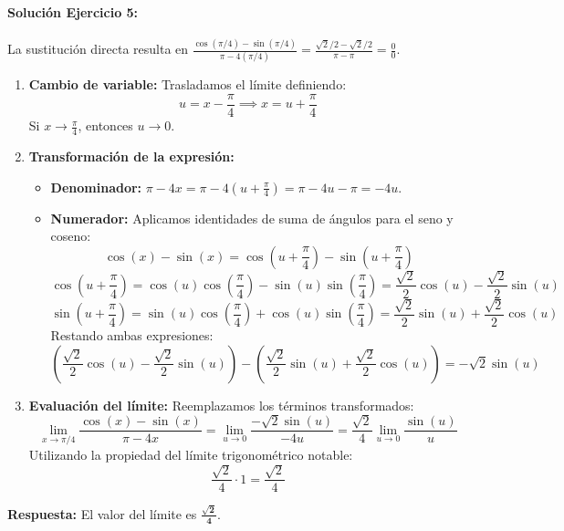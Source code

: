 \documentclass[11pt,letterpaper]{article}
\begin{document}
\paragraph{Solución Ejercicio 5:}
La sustitución directa resulta en $\frac{\cos(\pi/4) - \sin(\pi/4)}{\pi - 4(\pi/4)} = \frac{\sqrt{2}/2 - \sqrt{2}/2}{\pi - \pi} = \frac{0}{0}$.
\begin{enumerate}
    \item \textbf{Cambio de variable:} Trasladamos el límite definiendo:
    $$u = x - \frac{\pi}{4} \implies x = u + \frac{\pi}{4}$$
    Si $x \to \frac{\pi}{4}$, entonces $u \to 0$.
    \item \textbf{Transformación de la expresión:}
    \begin{itemize}
        \item \textbf{Denominador:} $\pi - 4x = \pi - 4\left(u + \frac{\pi}{4}\right) = \pi - 4u - \pi = -4u$.
        \item \textbf{Numerador:} Aplicamos identidades de suma de ángulos para el seno y coseno:
        $$\cos(x) - \sin(x) = \cos\left(u + \frac{\pi}{4}\right) - \sin\left(u + \frac{\pi}{4}\right)$$
        $$\cos\left(u + \frac{\pi}{4}\right) = \cos(u)\cos\left(\frac{\pi}{4}\right) - \sin(u)\sin\left(\frac{\pi}{4}\right) = \frac{\sqrt{2}}{2}\cos(u) - \frac{\sqrt{2}}{2}\sin(u)$$
        $$\sin\left(u + \frac{\pi}{4}\right) = \sin(u)\cos\left(\frac{\pi}{4}\right) + \cos(u)\sin\left(\frac{\pi}{4}\right) = \frac{\sqrt{2}}{2}\sin(u) + \frac{\sqrt{2}}{2}\cos(u)$$
        Restando ambas expresiones:
        $$\left( \frac{\sqrt{2}}{2}\cos(u) - \frac{\sqrt{2}}{2}\sin(u) \right) - \left( \frac{\sqrt{2}}{2}\sin(u) + \frac{\sqrt{2}}{2}\cos(u) \right) = -\sqrt{2}\sin(u)$$
    \end{itemize}
    \item \textbf{Evaluación del límite:} Reemplazamos los términos transformados:
    $$\lim_{x\to \pi/4} \frac{\cos(x) - \sin(x)}{\pi - 4x} = \lim_{u\to 0} \frac{-\sqrt{2}\sin(u)}{-4u} = \frac{\sqrt{2}}{4} \lim_{u\to 0} \frac{\sin(u)}{u}$$
    Utilizando la propiedad del límite trigonométrico notable:
    $$\frac{\sqrt{2}}{4} \cdot 1 = \frac{\sqrt{2}}{4}$$
\end{enumerate}
\textbf{Respuesta:} El valor del límite es $\mathbf{\frac{\sqrt{2}}{4}}$.
\end{document}
